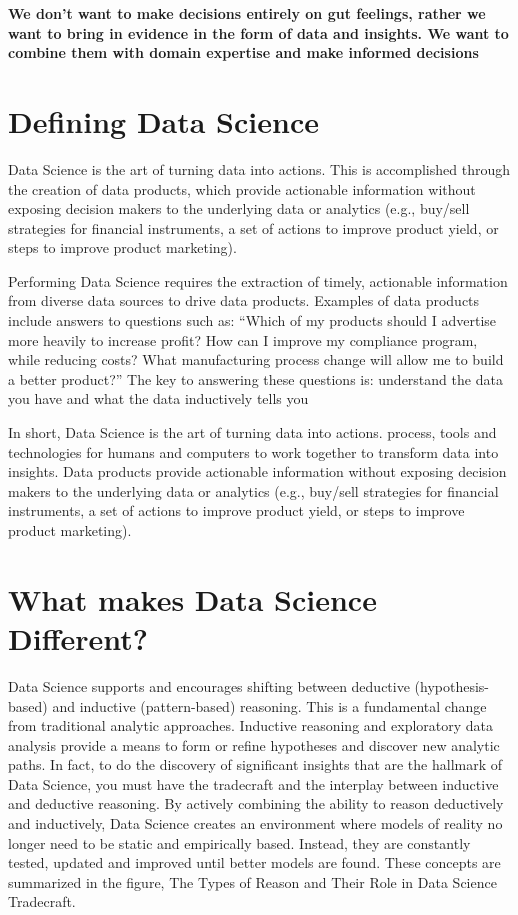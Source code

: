\documentclass{rapportECL}
\begin{document}
\textbf{We don't want to make decisions entirely on gut feelings, rather we want to bring in evidence in the form of data and insights. We want to combine them with domain expertise and make informed decisions}

\section{Defining Data Science}

Data Science is the art of turning data into actions. This is accomplished through the creation of data products, which provide actionable information without exposing decision makers to the underlying data or analytics (e.g., buy/sell strategies for financial instruments, a set of actions to improve product yield, or steps to improve product marketing).

Performing Data Science requires the extraction of timely, actionable information from diverse data sources to drive data products. Examples of data products include answers to questions such as: “Which of my products should I advertise more heavily to increase profit? How can I improve my compliance program, while reducing costs? What manufacturing process change will allow me to build a better product?” The key to answering these questions is: understand the data you have and what the data inductively tells you

In short,  Data Science is the art of turning data into actions. process, tools and technologies for humans and computers to work together to transform data into insights. Data products provide actionable information without exposing decision makers to the underlying data or analytics (e.g., buy/sell strategies for financial instruments, a set of actions to improve product yield, or steps to improve product marketing).




\section{What makes Data Science Different?}

Data Science supports and encourages shifting between deductive (hypothesis-based) and inductive (pattern-based) reasoning. This is a fundamental change from traditional analytic approaches. Inductive reasoning and exploratory data analysis provide a means to form or refine hypotheses and discover new analytic paths. In fact, to do the discovery of significant insights that are the hallmark of Data Science, you must have the tradecraft and the interplay between inductive
and deductive reasoning. By actively combining the ability to reason deductively and inductively, Data Science creates an environment where models of reality no longer need to be static and empirically based. Instead, they are constantly tested, updated and improved until better models are found. These concepts are summarized in the figure, The Types of Reason and Their Role in Data Science Tradecraft.
\end{document}
